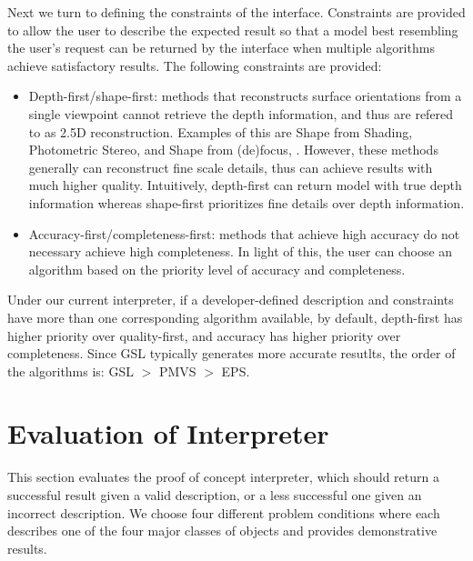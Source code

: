 Next we turn to defining the constraints of the interface. Constraints are provided to allow the user to describe the expected result so that a model best resembling the user's request can be returned by the interface when multiple algorithms achieve satisfactory results. The following constraints are provided: 
\begin{itemize}
\item Depth-first/shape-first: methods that reconstructs surface orientations from a single viewpoint cannot retrieve the depth information, and thus are refered to as 2.5D reconstruction. Examples of this are Shape from Shading, Photometric Stereo, and Shape from (de)focus, \etc. However, these methods generally can reconstruct fine scale details, thus can achieve results with much higher quality. Intuitively, depth-first can return model with true depth information whereas shape-first prioritizes fine details over depth information.
\item Accuracy-first/completeness-first: methods that achieve high accuracy do not necessary achieve high completeness. In light of this, the user can choose an algorithm based on the priority level of accuracy and completeness.
\end{itemize}

Under our current interpreter, if a developer-defined description and constraints have more than one corresponding algorithm available, by default, depth-first has higher priority over quality-first, and accuracy has higher priority over completeness. Since GSL typically generates more accurate resutlts, the order of the algorithms is: GSL $>$ PMVS $>$ EPS.

\section{Evaluation of Interpreter}
\label{sec:eval_interp}
This section evaluates the proof of concept interpreter, which should return a successful result given a valid description, or a less successful one given an incorrect description. We choose four different problem conditions where each describes one of the four major classes of objects and provides demonstrative results.

